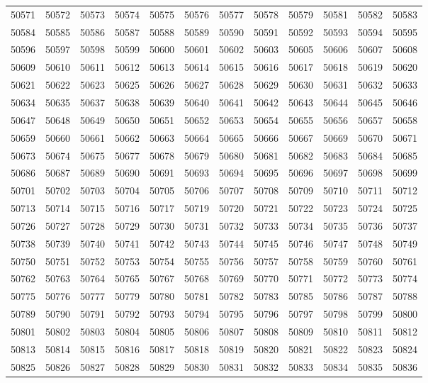 \begin{center}
\begin{longtable}{llllllllllll}
50571 &50572 &50573 &50574 &50575 &50576 &50577 &50578 &50579 &50581 &50582 &50583 \\
50584 &50585 &50586 &50587 &50588 &50589 &50590 &50591 &50592 &50593 &50594 &50595 \\
50596 &50597 &50598 &50599 &50600 &50601 &50602 &50603 &50605 &50606 &50607 &50608 \\
50609 &50610 &50611 &50612 &50613 &50614 &50615 &50616 &50617 &50618 &50619 &50620 \\
50621 &50622 &50623 &50625 &50626 &50627 &50628 &50629 &50630 &50631 &50632 &50633 \\
50634 &50635 &50637 &50638 &50639 &50640 &50641 &50642 &50643 &50644 &50645 &50646 \\
50647 &50648 &50649 &50650 &50651 &50652 &50653 &50654 &50655 &50656 &50657 &50658 \\
50659 &50660 &50661 &50662 &50663 &50664 &50665 &50666 &50667 &50669 &50670 &50671 \\
50673 &50674 &50675 &50677 &50678 &50679 &50680 &50681 &50682 &50683 &50684 &50685 \\
50686 &50687 &50689 &50690 &50691 &50693 &50694 &50695 &50696 &50697 &50698 &50699 \\
50701 &50702 &50703 &50704 &50705 &50706 &50707 &50708 &50709 &50710 &50711 &50712 \\
50713 &50714 &50715 &50716 &50717 &50719 &50720 &50721 &50722 &50723 &50724 &50725 \\
50726 &50727 &50728 &50729 &50730 &50731 &50732 &50733 &50734 &50735 &50736 &50737 \\
50738 &50739 &50740 &50741 &50742 &50743 &50744 &50745 &50746 &50747 &50748 &50749 \\
50750 &50751 &50752 &50753 &50754 &50755 &50756 &50757 &50758 &50759 &50760 &50761 \\
50762 &50763 &50764 &50765 &50767 &50768 &50769 &50770 &50771 &50772 &50773 &50774 \\
50775 &50776 &50777 &50779 &50780 &50781 &50782 &50783 &50785 &50786 &50787 &50788 \\
50789 &50790 &50791 &50792 &50793 &50794 &50795 &50796 &50797 &50798 &50799 &50800 \\
50801 &50802 &50803 &50804 &50805 &50806 &50807 &50808 &50809 &50810 &50811 &50812 \\
50813 &50814 &50815 &50816 &50817 &50818 &50819 &50820 &50821 &50822 &50823 &50824 \\
50825 &50826 &50827 &50828 &50829 &50830 &50831 &50832 &50833 &50834 &50835 &50836 \\

\end{longtable}
\end{center}
